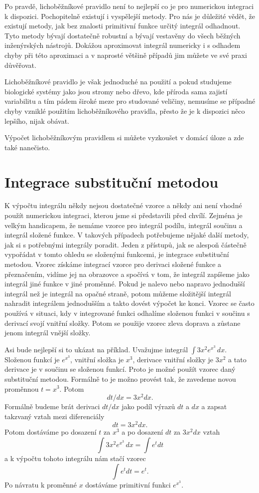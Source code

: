 \documentclass[12pt]{article}
\begin{document}
Po pravdě, lichoběžníkové pravidlo není to nejlepší co je pro numerickou integraci k dispozici. Pochopitelně existují i vyspělejší metody. Pro nás je důležité vědět, že existují metody, jak bez znalosti primitivní funkce určitý integrál odhadnout. Tyto metody bývají dostatečně robustní a bývají vestavěny do všech běžných inženýrských nástrojů. Dokážou aproximovat integrál numericky i s odhadem chyby při této aproximaci a v naprosté většině případů jim můžete ve své praxi důvěřovat. 

Lichoběžníkové pravidlo je však jednoduché na použití a pokud studujeme biologické systémy jako jsou stromy nebo dřevo, kde příroda sama zajistí variabilitu a tím pádem široké meze pro studované veličiny, nemusíme se případné chyby vzniklé použitím lichoběžníkového pravidla, přesto že je k dispozici něco lepšího, nijak obávat.

Výpočet lichoběžníkovým pravidlem si můžete vyzkoušet v domácí úloze a zde také nanečisto. 

\section*{Integrace substituční metodou}

K výpočtu integrálu někdy nejsou dostatečné vzorce a někdy ani není vhodné použít numerickou integraci, kterou jsme si představili před chvílí. Zejména je velkým handicapem, že nemáme vzorce pro integrál podílu, integrál součinu a integrál složené funkce. V takových případech potřebujeme nějaké další metody, jak si s potřebnými integrály poradit. Jeden z přístupů, jak se alespoň částečně vypořádat v tomto ohledu se složenými funkcemi, je integrace substituční metodou. Vzorec získáme integrací vzorce pro derivaci složené funkce a přeznačením, vidíme jej na obrazovce a spočívá v tom, že integrál zapíšeme jako integrál jiné funkce v jiné proměnné. Pokud je nalevo nebo napravo jednodušší integrál než je integrál na opačné straně, potom můžeme složitější integrál nahradit integrálem jednodušším a takto dovést výpočet ke konci. Vzorec se často používá v situaci, kdy v integrované funkci odhalíme složenou funkci v součinu s derivací svojí vnitřní složky. Potom se použije vzorec zleva doprava a zůstane jenom integrál vnější složky.

Asi bude nejlepší si to ukázat na příklad. Uvažujme integrál $\int 3x^2 e^{x^3}\,dx$. Složenou funkcí je $e^{x^3}$, vnitřní složka je $x^3$, derivace vnitřní složky je $3x^2$ a tato derivace je v součinu se složenou funkcí. Proto je možné použít vzorec daný substituční metodou. Formálně to je možno provést tak, že zavedeme novou proměnnou $t=x^3$. Potom $$dt/dx=3x^2dx.$$ Formálně budeme brát derivaci $dt/dx$ jako podíl výrazů $dt$ a $dx$ a zapsat takzvaný vztah mezi diferenciály
$$dt=3x^2 dx.$$ Potom dostáváme po dosazení $t$ za $x^3$ a po dosazení $dt$ za $3x^2dx$ vztah
$$\int 3x^2 e^{x^3}\,dx=\int e^t dt$$
a k výpočtu tohoto integrálu nám stačí vzorec
$$\int e^t dt=e^t.$$
Po návratu k proměnné $x$ dostáváme primitivní funkci $e^{x^3}$.
\end{document}
